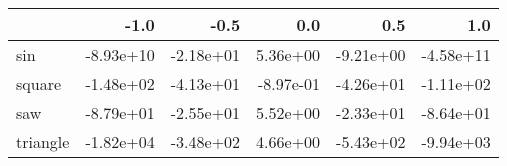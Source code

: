 \begin{tabular}{lrrrrr}
\toprule
{} &      -1.0 &      -0.5 &       0.0 &       0.5 &       1.0 \\
\midrule
sin      & -8.93e+10 & -2.18e+01 &  5.36e+00 & -9.21e+00 & -4.58e+11 \\
square   & -1.48e+02 & -4.13e+01 & -8.97e-01 & -4.26e+01 & -1.11e+02 \\
saw      & -8.79e+01 & -2.55e+01 &  5.52e+00 & -2.33e+01 & -8.64e+01 \\
triangle & -1.82e+04 & -3.48e+02 &  4.66e+00 & -5.43e+02 & -9.94e+03 \\
\bottomrule
\end{tabular}
